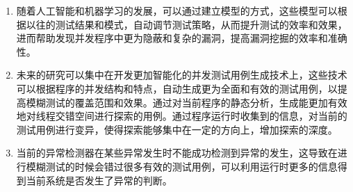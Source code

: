 \begin{enumerate}
\item 随着人工智能和机器学习的发展，可以通过建立模型的方式，这些模型可以根据以往的测试结果和模式，自动调节测试策略，从而提升测试的效率和效果，进而帮助发现并发程序中更为隐蔽和复杂的漏洞，提高漏洞挖掘的效率和准确性。
\item 未来的研究可以集中在开发更加智能化的并发测试用例生成技术上，这些技术可以根据程序的并发结构和特点，自动生成更为全面和有效的测试用例，以提高模糊测试的覆盖范围和效果。通过对当前程序的静态分析，生成能更加有效地对线程交错空间进行探索的用例。通过程序运行时收集到的信息，对当前的测试用例进行变异，使得探索能够集中在一定的方向上，增加探索的深度。
\item 当前的异常检测器在某些异常发生时不能成功检测到异常的发生，这导致在进行模糊测试的时候会错过很多有效的测试用例，可以利用运行时更多的信息得到当前系统是否发生了异常的判断。
\end{enumerate}

\newpage
\begingroup
    \printbibliography[title={参考文献}]
\endgroup
